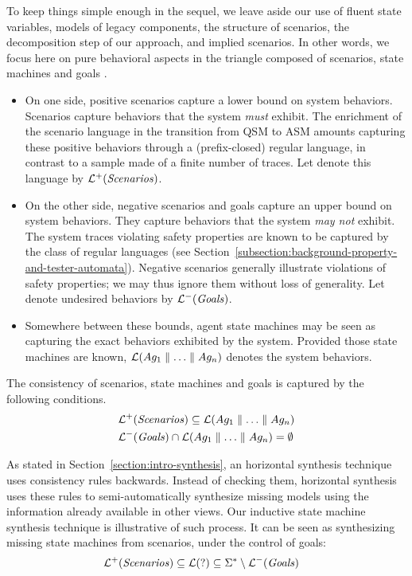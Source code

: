 To keep things simple enough in the sequel, we leave aside our use of fluent state variables, models of legacy components, the structure of scenarios, the decomposition step of our approach, and implied scenarios. In other words, we focus here on pure behavioral aspects in the triangle composed of scenarios, state machines and goals \cite{Damas:2006, Uchitel:2007}.
\begin{itemize}
\item On one side, positive scenarios capture a lower bound on system behaviors. Scenarios capture behaviors that the system \emph{must} exhibit. The enrichment of the scenario language in the transition from QSM to ASM amounts capturing these positive behaviors through a (prefix-closed) regular language, in contrast to a sample made of a finite number of traces. Let denote this language by $\mathcal{L}^+(\mbox{\emph{Scenarios}})$. 
\item On the other side, negative scenarios and goals capture an upper bound on system behaviors. They capture behaviors that the system \emph{may not} exhibit. The system traces violating safety properties are known to be captured by the class of regular languages (see Section~\ref{subsection:background-property-and-tester-automata}). Negative scenarios generally illustrate violations of safety properties; we may thus ignore them without loss of generality. Let denote undesired behaviors by $\mathcal{L}^-(\mbox{\emph{Goals}})$.
\item Somewhere between these bounds, agent state machines may be seen as capturing the exact behaviors exhibited by the system. Provided those state machines are known, $\mathcal{L}(Ag_1 \parallel \ldots \parallel Ag_n)$ denotes the system behaviors. 
\end{itemize}

The consistency of scenarios, state machines and goals is captured by the following conditions.
\begin{align*}
&\mathcal{L}^+(\mbox{\emph{Scenarios}}) \subseteq \mathcal{L}(Ag_1 \parallel \ldots \parallel Ag_n) \\
&\mathcal{L}^-(\mbox{\emph{Goals}}) \cap \mathcal{L}(Ag_1 \parallel \ldots \parallel Ag_n) = \emptyset
\end{align*}

As stated in Section~\ref{section:intro-synthesis}, an horizontal synthesis technique uses consistency rules backwards. Instead of checking them, horizontal synthesis uses these rules to semi-automatically synthesize missing models using the information already available in other views. Our inductive state machine synthesis technique is illustrative of such process. It can be seen as synthesizing missing state machines from scenarios, under the control of goals:
\begin{align*}
&\mathcal{L}^+(\mbox{\emph{Scenarios}}) \subseteq \mathcal{L}(?) \subseteq  \Sigma^* \setminus \mathcal{L}^-(\mbox{\emph{Goals}})
\end{align*}

